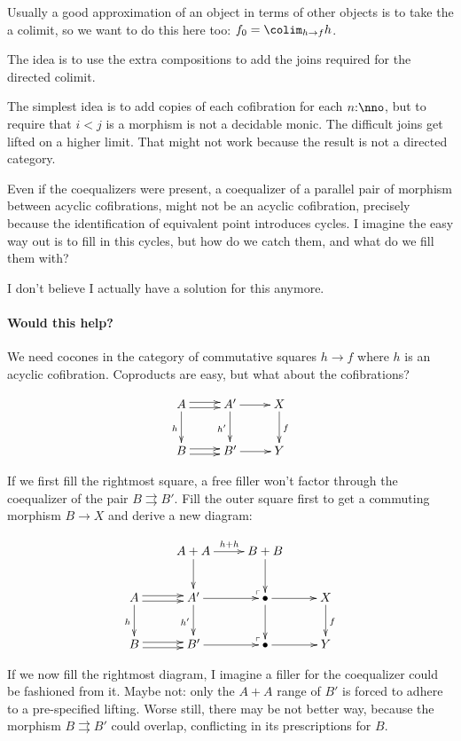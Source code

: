 \documentclass[csh.tex]{subfiles}
\makeatletter
\newcommand\pushout{\ar@{}[dr]|(.9)\ulcorner}
\newcommand\parr{\ar@<.5ex>[r]\ar@<-.5ex>[r]}
\makeatother
\begin{document}
Usually a good approximation of an object in terms of other objects is to take the a colimit, so we want to do this here too: $f_0 = \colim_{h\to f}h$.

The idea is to use the extra compositions to add the joins required for the directed colimit.

The simplest idea is to add copies of each cofibration for each $n\of \nno$, but to require that $i < j$ is a morphism is not a decidable monic. The difficult joins get lifted on a higher limit. That might not work because the result is not a directed category. 

Even if the coequalizers were present, a coequalizer of a parallel pair of morphism between acyclic cofibrations, might not be an acyclic cofibration, precisely because the identification of equivalent point introduces cycles. I imagine the easy way out is to fill in this cycles, but how do we catch them, and what do we fill them with?

I don't believe I actually have a solution for this anymore.

\paragraph{Would this help?}
We need cocones in the category of commutative squares $h\to f$ where $h$ is an acyclic cofibration. Coproducts are easy, but what about the cofibrations?

\[\xymatrix{
A\parr\ar[d]_h & A'\ar[r]\ar[d]_{h'} & X\ar[d]^f\\
B\parr & B'\ar[r] & Y
}\]

If we first fill the rightmost square, a free filler won't factor through the coequalizer of the pair $B\rightrightarrows B'$. Fill the outer square first to get a commuting morphism $B\to X$ and derive a new diagram:

\[\xymatrix{
& A+A \ar[r]^{h+h}\ar[d]\pushout & B+B\ar[d] \\
A\parr\ar[d]_h & A' \ar[r]\ar[d]_{h'}\pushout & \bullet \ar[r]\ar[d] & X\ar[d]^f\\
B\parr & B' \ar[r] & \bullet \ar[r] & Y
}\]

If we now fill the rightmost diagram, I imagine a filler for the coequalizer could be fashioned from it. Maybe not: only the $A+A$ range of $B'$ is forced to adhere to a pre-specified lifting. Worse still, there may be not better way, because the morphism $B\rightrightarrows B'$ could overlap, conflicting in its prescriptions for $B$.
\end{document}
